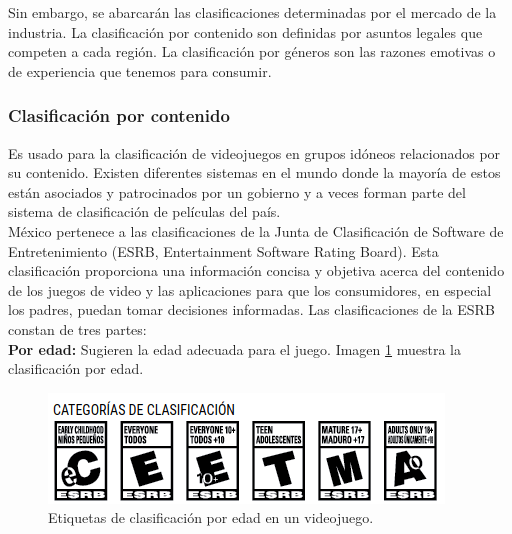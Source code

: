 Sin embargo, se abarcarán las clasificaciones determinadas por el mercado de la industria. La clasificación por contenido son definidas por asuntos legales que competen a cada región. La clasificación por géneros son las razones emotivas o de experiencia que tenemos para consumir.
\\[1pt]

\subsubsection{Clasificación por contenido}
	Es usado para la clasificación de videojuegos en grupos idóneos relacionados por su contenido. Existen diferentes sistemas en el mundo donde la mayoría de estos están asociados y patrocinados por un gobierno y a veces forman parte del sistema de clasificación de películas del país.\\[1pt]	
	
	México pertenece a las clasificaciones de la Junta de Clasificación de Software de Entretenimiento (ESRB, Entertainment Software Rating Board)\cite{vid02}. Esta clasificación proporciona una información concisa y objetiva acerca del contenido de los juegos de video y las aplicaciones para que los consumidores, en especial los padres, puedan tomar decisiones informadas. Las clasificaciones de la ESRB constan de tres partes:\\[1pt]
			
\textbf{Por edad: }
Sugieren la edad adecuada para el juego. Imagen \ref{fig:clasEti} muestra la clasificación por edad.	
\\[1pt]

	\begin{figure}
	\centering 
	\includegraphics[width=\textwidth]{03MarcoTeorico/imageR/clasEti}
	\caption{Etiquetas de clasificación por edad en un videojuego.}
	\label{fig:clasEti}
\end{figure}


